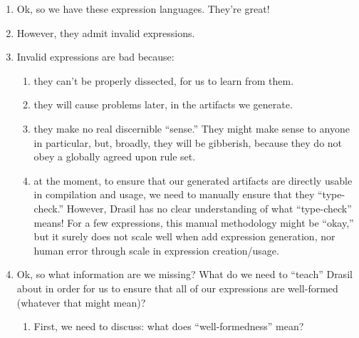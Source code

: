 \begin{enumerate}

      \item Ok, so we have these expression languages. They're great!

      \item However, they admit invalid expressions.

      \item Invalid expressions are bad because:

            \begin{enumerate}

                  \item they can't be properly dissected, for us to learn from
                        them.

                  \item they will cause problems later, in the artifacts we
                        generate.

                  \item they make no real discernible ``sense.'' They might make
                        sense to anyone in particular, but, broadly, they will
                        be gibberish, because they do not obey a globally agreed
                        upon rule set.

                  \item at the moment, to ensure that our generated artifacts
                        are directly usable in compilation and usage, we need to
                        manually ensure that they ``type-check.'' However,
                        Drasil has no clear understanding of what ``type-check''
                        means! For a few expressions, this manual methodology
                        might be ``okay,'' but it surely does not scale well
                        when add expression generation, nor human error through
                        scale in expression creation/usage.

            \end{enumerate}

      \item Ok, so what information are we missing? What do we need to ``teach''
            Drasil about in order for us to ensure that all of our expressions
            are well-formed (whatever that might mean)?

            \begin{enumerate}

                  \item First, we need to discuss: what does ``well-formedness''
                        mean?


\end{enumerate}
\end{enumerate}
